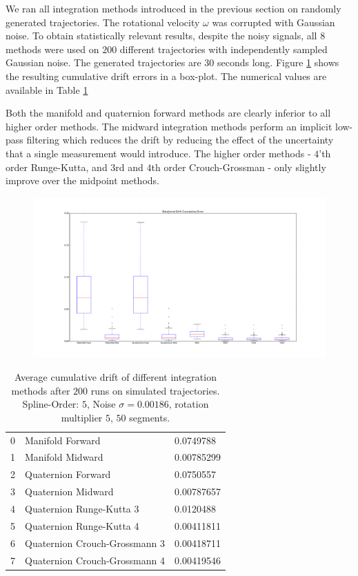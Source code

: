\documentclass[10pt,a4paper]{article}
\numberwithin{equation}{section}
\begin{document}
We ran all integration methods introduced in the previous section on randomly generated trajectories.
The rotational velocity $\omega$ was corrupted with Gaussian noise.
To obtain statistically relevant results, despite the noisy signals, all $8$ methods were used on $200$ different trajectories with independently sampled Gaussian noise. The generated trajectories are $30$ seconds long.
Figure \ref{fig:rotation_integration_drift_boxplot} shows the resulting cumulative drift errors in a box-plot. The numerical values are available in Table \ref{tbl:rotation_integration_drift}

Both the manifold and quaternion forward methods are clearly inferior to all higher order methods.
The midward integration methods perform an implicit low-pass filtering which reduces the drift by reducing the effect of the uncertainty that a single measurement would introduce.
The higher order methods - $4$'th order Runge-Kutta, and $3$rd and $4$th order Crouch-Grossman - only slightly improve over the midpoint methods.

\begin{figure}
\includegraphics[width=14cm]{figures/rotation_integration_drift_boxplot.pdf}
\caption{}
\label{fig:rotation_integration_drift_boxplot}
\end{figure}	

\begin{table}
\begin{center}
\begin{tabular}{ l | l || l }
0  & Manifold Forward &  0.0749788\\
1  & Manifold Midward &  0.00785299 \\
2  & Quaternion Forward &  0.0750557 \\
3  & Quaternion Midward & 0.00787657\\
4  & Quaternion Runge-Kutta 3 & 0.0120488 \\
5  & Quaternion Runge-Kutta 4 & 0.00411811 \\
6  & Quaternion Crouch-Grossmann 3 & 0.00418711\\
7  & Quaternion Crouch-Grossmann 4 & 0.00419546
\end{tabular}
\end{center}
\caption{Average cumulative drift of different integration methods after $200$ runs on simulated trajectories. Spline-Order: $5$, Noise $\sigma = 0.00186$, rotation multiplier $5$, $50$ segments.}
\label{tbl:rotation_integration_drift}
\end{table}
\end{document}
